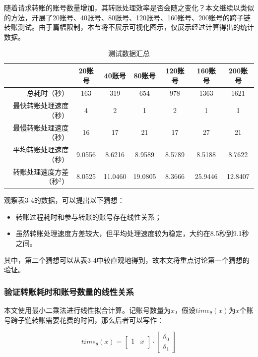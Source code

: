 随着请求转账的账号数量增加，其转账处理效率是否会随之变化？本文继续以类似的方法，开展了20账号、40账号、80账号、120账号、160账号、200账号的跨子链转账测试。由于篇幅限制，本节将不展示可视化图示，仅展示经过计算得出的统计数据。

\begin{table}[htbp]
    \linespread{1.5}
    \centering
    \caption{测试数据汇总}\label{测试数据汇总}
    \begin{tabular}{r|c|c|c|c|c|c} \toprule
                        & 20账号   & 40账号    & 80账号    & 120账号  & 160账号   & 200账号   \\\hline
        总耗时（秒）          & 163    & 319     & 654     & 978    & 1363    & 1621    \\
        最快转账处理速度（秒）     & 4      & 2       & 1       & 2      & 1       & 1       \\
        最慢转账处理速度（秒）     & 16     & 17      & 21      & 17     & 27      & 21      \\
        平均转账处理速度（秒）     & 9.0556 & 8.6216  & 8.9589  & 8.5789 & 8.5188 & 8.7622  \\
        转账处理速度方差（秒$^2$） & 8.0525 & 11.0460 & 19.0805 & 8.3666 & 25.9446 & 12.8407 \\
        \bottomrule
    \end{tabular}
\end{table}

观察表3-4的数据，可以提出以下猜想：
\begin{itemize}
    \item 转账过程耗时和参与转账的账号存在线性关系；
    \item 虽然转账处理速度方差较大，但平均处理速度较为稳定，大约在8.5秒到9.1秒之间。
\end{itemize}

其中，第二个猜想可以从表3-4中较直观地得到，故本文将重点讨论第一个猜想的验证。

\subsubsection{验证转账耗时和账号数量的线性关系}

本文使用最小二乘法进行线性拟合计算。记账号数量为$x$，假设$time_\theta(x)$为$x$个账号跨子链转账需要花费的时间，那么后者可以写作：

$$
    time_\theta(x) =
    \begin{bmatrix}
        1 & x \\
    \end{bmatrix}
    \cdot
    \begin{bmatrix}
        \theta_0 \\
        \theta_1
    \end{bmatrix}
$$

